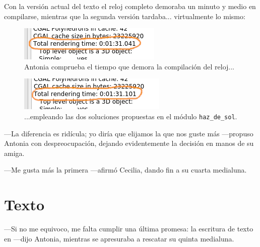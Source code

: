 Con la versión actual del texto el reloj completo demoraba un minuto y
medio en compilarse, mientras que la segunda versión tardaba...
virtualmente lo mismo:


\begin{figure}[ht]
  \centering
  \includegraphics[width=.55\textwidth]{imagenes/tiempo-version-1}  
  \caption{Antonia comprueba el tiempo que demora la compilación del reloj...}
  \label{fig:tiempo-version-1}
\end{figure}




\begin{figure}[ht]
  \centering
  \includegraphics[width=.55\textwidth]{imagenes/tiempo-version-2}  
  \caption{...empleando las dos soluciones propuestas en el módulo
    \lstinline!haz_de_sol!.}
  \label{fig:tiempo-version-2}
\end{figure}


---La diferencia es ridícula; yo diría que elijamos la que nos guste
más ---propuso Antonia con despreocupación, dejando evidentemente la
decisión en manos de su amiga.

---Me gusta más la primera ---afirmó Cecilia, dando fin a su cuarta
medialuna.

\section{Texto}

---Si no me equivoco, me falta cumplir una última promesa: la
escritura de texto en \openscad{} ---dijo Antonia, mientras se
apresuraba a rescatar su quinta medialuna.


